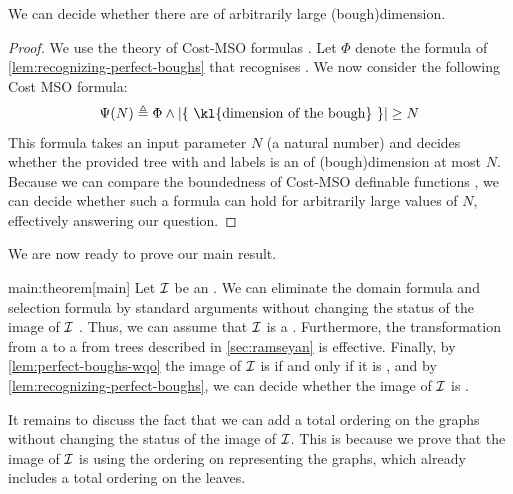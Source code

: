 \begin{corollary}
  We can decide whether there are  of arbitrarily large
  \kl(bough){dimension}.
\end{corollary}
\begin{proof}
  We use the theory of Cost-MSO formulas \cite[Section 6]{COLOD10}.
  Let $\Phi$ denote the formula of \cref{lem:recognizing-perfect-boughs}
  that recognises .
  We now consider the following Cost MSO formula:
  \begin{equation*}
    \Psi(N) \defined 
    \Phi \land |\{ \text{ \kl{dimension of the bough} } \}| \geq N
  \end{equation*}
  This formula takes an input parameter $N$ (a natural number)
  and decides whether the provided tree with  and labels
  is an  of \kl(bough){dimension} at most $N$.
  Because we can compare the boundedness of Cost-MSO definable functions
  \cite[Corollary 16]{COLOD10}, we can decide whether such a 
  formula can hold for arbitrarily large values of $N$, effectively 
  answering our question.
\end{proof}


We are now ready to prove our main result.

\begin{proofof}{main:theorem}[main]
  Let $\mathcal{I}$ be an .
  We can eliminate the domain formula and selection formula 
  by standard arguments without changing the 
  status of the image of $\mathcal{I}$ \cite[Lemma 8]{LOPEZ24}.
  Thus, we can assume that $\mathcal{I}$ is a .
  Furthermore, the transformation from a 
  to a  from trees
  described in \cref{sec:ramseyan} is effective.
  Finally, by \cref{lem:perfect-boughs-wqo}
  the image of $\mathcal{I}$ is 
  if and only if it is , and 
  by \cref{lem:recognizing-perfect-boughs},
  we can decide whether the image of $\mathcal{I}$ is . 

  It remains to discuss the fact that we can add a total ordering on the graphs 
  without changing the  status of the image of $\mathcal{I}$.
  This is because we prove that the image of $\mathcal{I}$ is 
  using the  ordering on 
  representing the graphs, which already includes a total ordering on the leaves.
\end{proofof}

